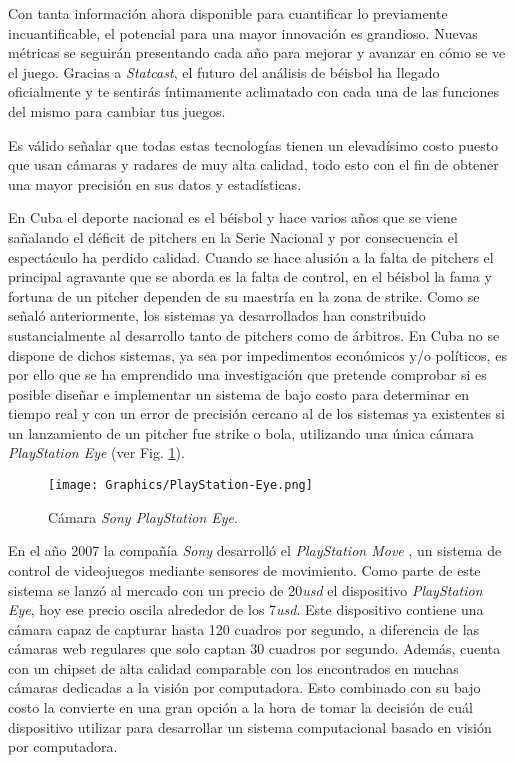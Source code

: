 Con tanta información ahora disponible para cuantificar lo previamente incuantificable, el potencial para una mayor innovación es grandioso. Nuevas métricas se seguirán presentando cada año para mejorar y avanzar en cómo se ve el juego. Gracias a \textit{Statcast}, el futuro del análisis de béisbol ha llegado oficialmente y te sentirás íntimamente aclimatado con cada una de las funciones del mismo para cambiar tus juegos.

Es válido señalar que todas estas tecnologías tienen un elevadísimo costo puesto que usan cámaras y radares de muy alta calidad, todo esto con el fin de obtener una mayor precisión en sus datos y estadísticas.

En Cuba el deporte nacional es el béisbol y hace varios años que se viene sañalando el déficit de pitchers en la Serie Nacional y por consecuencia el espectáculo ha perdido calidad. Cuando se hace alusión a la falta de pitchers el principal agravante que se aborda es la falta de control, en el béisbol la fama y fortuna de un pitcher dependen de su maestría en la zona de strike. Como se señaló anteriormente, los sistemas ya desarrollados han constribuido sustancialmente al desarrollo tanto de pitchers como de árbitros. En Cuba no se dispone de dichos sistemas, ya sea por impedimentos económicos y/o políticos, es por ello que se ha emprendido una investigación que pretende comprobar si es posible diseñar e implementar un sistema de bajo costo para determinar en tiempo real y con un error de precisión cercano al de los sistemas ya existentes si un lanzamiento de un pitcher fue strike o bola, utilizando una única cámara \textit{PlayStation Eye} \cite{PlayStationEye} (ver Fig. \ref{fig:PlayStationEye}).

\begin{figure}[h!]
    \centering
    \texttt{[image: Graphics/PlayStation-Eye.png]}
    \caption{Cámara \textit{Sony PlayStation Eye}.}
    \label{fig:PlayStationEye}
\end{figure}

En el año 2007 la compañía \textit{Sony} desarrolló el \textit{PlayStation Move} \cite{PlayStationMove}, un sistema de control de videojuegos mediante sensores de movimiento. Como parte de este sistema se lanzó al mercado con un precio de 20\textit{usd} el dispositivo \textit{PlayStation Eye}, hoy ese precio oscila alrededor de los 7\textit{usd}. Este dispositivo contiene una cámara capaz de capturar hasta 120 cuadros por segundo, a diferencia de las cámaras web regulares que solo captan 30 cuadros por segundo. Además, cuenta con un chipset de alta calidad comparable con los encontrados en muchas cámaras dedicadas a la visión por computadora. Esto combinado con su bajo costo la convierte en una gran opción a la hora de tomar la decisión de cuál dispositivo utilizar para desarrollar un sistema computacional basado en visión por computadora.

